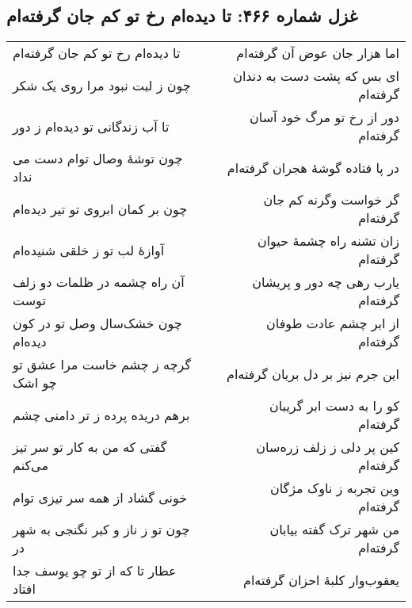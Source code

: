 \begin{center}
\section*{غزل شماره ۴۶۶: تا دیده‌ام رخ تو کم جان گرفته‌ام}
\label{sec:466}
\begin{longtable}{l p{0.5cm} r}
تا دیده‌ام رخ تو کم جان گرفته‌ام
&&
اما هزار جان عوض آن گرفته‌ام
\\
چون ز لبت نبود مرا روی یک شکر
&&
ای بس که پشت دست به دندان گرفته‌ام
\\
تا آب زندگانی تو دیده‌ام ز دور
&&
دور از رخ تو مرگ خود آسان گرفته‌ام
\\
چون توشهٔ وصال توام دست می نداد
&&
در پا فتاده گوشهٔ هجران گرفته‌ام
\\
چون بر کمان ابروی تو تیر دیده‌ام
&&
گر خواست وگرنه کم جان گرفته‌ام
\\
آوازهٔ لب تو ز خلقی شنیده‌ام
&&
زان تشنه راه چشمهٔ حیوان گرفته‌ام
\\
آن راه چشمه در ظلمات دو زلف توست
&&
یارب رهی چه دور و پریشان گرفته‌ام
\\
چون خشک‌سال وصل تو در کون دیده‌ام
&&
از ابر چشم عادت طوفان گرفته‌ام
\\
گرچه ز چشم خاست مرا عشق تو چو اشک
&&
این جرم نیز بر دل بریان گرفته‌ام
\\
برهم دریده پرده ز تر دامنی چشم
&&
کو را به دست ابر گریبان گرفته‌ام
\\
گفتی که من به کار تو سر تیز می‌کنم
&&
کین پر دلی ز زلف زره‌سان گرفته‌ام
\\
خونی گشاد از همه سر تیزی توام
&&
وین تجربه ز ناوک مژگان گرفته‌ام
\\
چون تو ز ناز و کبر نگنجی به شهر در
&&
من شهر ترک گفته بیابان گرفته‌ام
\\
عطار تا که از تو چو یوسف جدا افتاد
&&
یعقوب‌وار کلبهٔ احزان گرفته‌ام
\\
\end{longtable}
\end{center}
